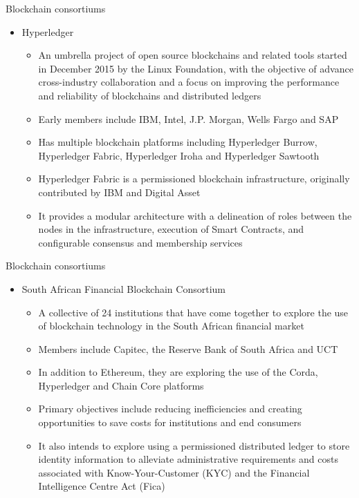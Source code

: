 \documentclass[11pt]{beamer}
\begin{document}

\begin{frame}{Blockchain consortiums}
	\begin{itemize}
		\item Hyperledger
		\begin{itemize}
			\item An umbrella project of open source blockchains and related tools started in December 2015 by the Linux Foundation, with the objective of advance cross-industry collaboration and a focus on improving the performance and reliability of blockchains and distributed ledgers
			\item Early members include IBM, Intel, J.P. Morgan, Wells Fargo and SAP
			\item Has multiple blockchain platforms including Hyperledger Burrow, Hyperledger Fabric, Hyperledger Iroha and Hyperledger Sawtooth
			\item Hyperledger Fabric is a permissioned blockchain infrastructure, originally contributed by IBM and Digital Asset
			\item It provides a modular architecture with a delineation of roles between the nodes in the infrastructure, execution of Smart Contracts, and configurable consensus and membership services
		\end{itemize}
	\end{itemize}
\end{frame}


\begin{frame}{Blockchain consortiums}
	\begin{itemize}
		\item South African Financial Blockchain Consortium
		\begin{itemize}
			\item A collective of 24 institutions that have come together to explore the use of blockchain technology in the South African financial market
			\item Members include Capitec, the Reserve Bank of South Africa and UCT
			\item In addition to Ethereum, they are exploring the use of the Corda, Hyperledger and Chain Core platforms
			\item Primary objectives include reducing inefficiencies and creating opportunities to save costs for institutions and end consumers
			\item It also intends to explore using a permissioned distributed ledger to store identity information to alleviate administrative requirements and costs associated with Know-Your-Customer (KYC) and the Financial Intelligence Centre Act (Fica)
		\end{itemize}
	\end{itemize}
\end{frame}
\end{document}
